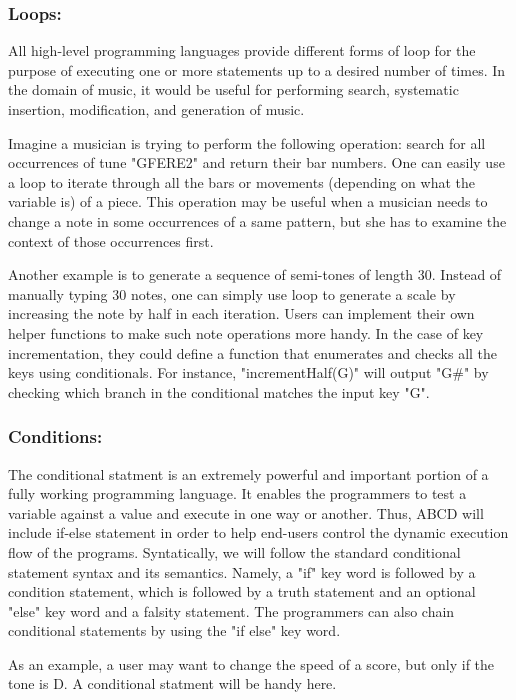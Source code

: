     \subsubsection{Loops:}
    All high-level programming languages provide different forms of loop for the purpose of executing one or more statements up to a desired number of times. In the domain of music, it would be useful for performing search, systematic insertion, modification, and generation of music. 

    Imagine a musician is trying to perform the following operation: search for all occurrences of tune "GFERE2" and return their bar numbers. One can easily use a loop to iterate through all the bars or movements (depending on what the variable is) of a piece. This operation may be useful when a musician needs to change a note in some occurrences of a same pattern, but she has to examine the context of those occurrences first\cite{SlashdotMedia17}.  

    Another example is to generate a sequence of semi-tones of length 30. Instead of manually typing 30 notes, one can simply use loop to generate a scale by increasing the note by half in each iteration. Users can implement their own helper functions to make such note operations more handy. In the case of key incrementation, they could define a function that enumerates and checks all the keys using conditionals. For instance, "incrementHalf(G)" will output "G\#" by checking which branch in the conditional matches the input key "G".

    \subsubsection{Conditions:}
        The conditional statment is an extremely powerful and important portion of a fully working programming language. It enables the programmers to test a variable against a value and execute in one way or another. Thus, ABCD will include if-else statement in order to help end-users control the dynamic execution flow of the programs. Syntatically, we will follow the standard conditional statement syntax and its semantics. Namely, a "if" key word is followed by a condition statement, which is followed by a truth statement and an optional "else" key word and a falsity statement. The programmers can also chain conditional statements by using the "if else" key word.

        As an example, a user may want to change the speed of a score, but only if the tone is D. A conditional statment will be handy here.

